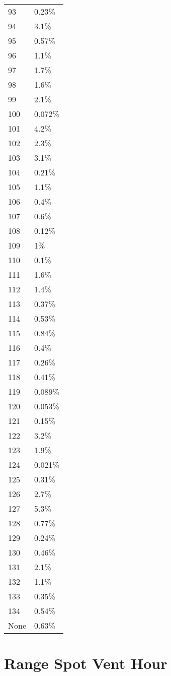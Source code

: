 \begin{longtable}[]{@{}ll@{}}
93 & 0.23\% \\
94 & 3.1\% \\
95 & 0.57\% \\
96 & 1.1\% \\
97 & 1.7\% \\
98 & 1.6\% \\
99 & 2.1\% \\
100 & 0.072\% \\
101 & 4.2\% \\
102 & 2.3\% \\
103 & 3.1\% \\
104 & 0.21\% \\
105 & 1.1\% \\
106 & 0.4\% \\
107 & 0.6\% \\
108 & 0.12\% \\
109 & 1\% \\
110 & 0.1\% \\
111 & 1.6\% \\
112 & 1.4\% \\
113 & 0.37\% \\
114 & 0.53\% \\
115 & 0.84\% \\
116 & 0.4\% \\
117 & 0.26\% \\
118 & 0.41\% \\
119 & 0.089\% \\
120 & 0.053\% \\
121 & 0.15\% \\
122 & 3.2\% \\
123 & 1.9\% \\
124 & 0.021\% \\
125 & 0.31\% \\
126 & 2.7\% \\
127 & 5.3\% \\
128 & 0.77\% \\
129 & 0.24\% \\
130 & 0.46\% \\
131 & 2.1\% \\
132 & 1.1\% \\
133 & 0.35\% \\
134 & 0.54\% \\
None & 0.63\% \\
\end{longtable}


\section{Range Spot Vent Hour}\label{range_spot_vent_hour}

